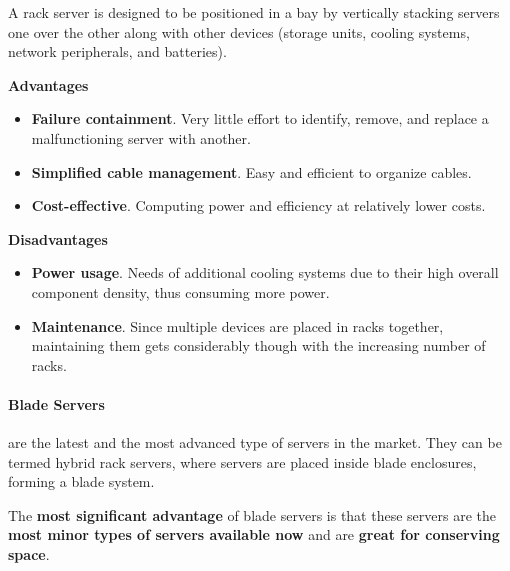\highspace
A rack server is designed to be positioned in a bay by vertically stacking servers one over the other along with other devices (storage units, cooling systems, network peripherals, and batteries).

\begin{flushleft}
    \textcolor{Green3}{ \textbf{Advantages}}
\end{flushleft}
\begin{itemize}[label=]
    \item \textbf{Failure containment}. Very little effort to identify, remove, and replace a malfunctioning server with another.

    \item \textbf{Simplified cable management}. Easy and efficient to organize cables.

    \item \textbf{Cost-effective}. Computing power and efficiency at relatively lower costs.
\end{itemize}

\begin{flushleft}
    \textcolor{Red2}{ \textbf{Disadvantages}}
\end{flushleft}
\begin{itemize}[label=]
    \item \textbf{Power usage}. Needs of additional cooling systems due to their high overall component density, thus consuming more power.

    \item \textbf{Maintenance}. Since multiple devices are placed in racks together, maintaining them gets considerably though with the increasing number of racks.
\end{itemize}

\newpage

\paragraph{Blade Servers}\label{paragraph: Blade Servers}

 are the latest and the most advanced type of servers in the market. They can be termed hybrid rack servers, where servers are placed inside blade enclosures, forming a blade system.

\highspace
The \textbf{most significant advantage} of blade servers is that these servers are the \textbf{most minor types of servers available now} and are \textbf{great for conserving space}.

